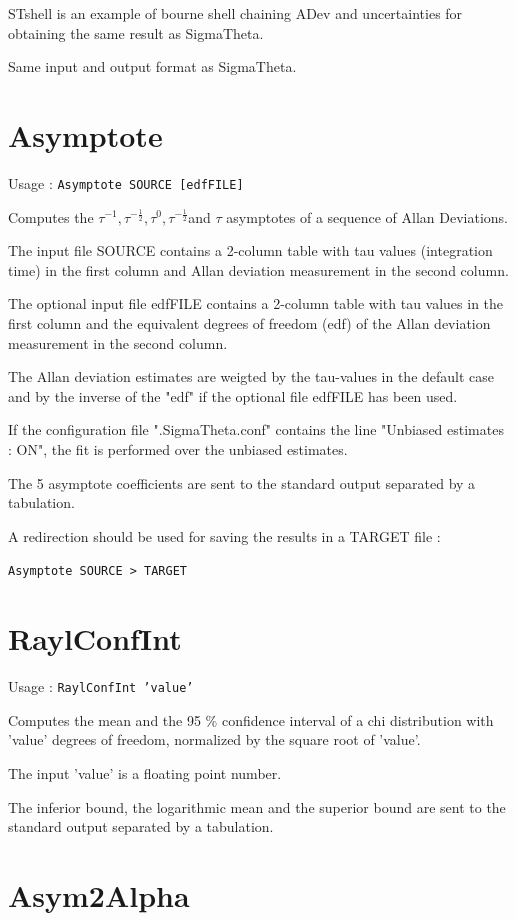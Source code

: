 \documentclass[10pt,a4paper,french]{article}
\begin{document}
STshell is an example of bourne shell chaining ADev and uncertainties for obtaining the same result as SigmaTheta.

Same input and output format as SigmaTheta.

\section{Asymptote}

Usage : {\tt{Asymptote SOURCE [edfFILE]}}

Computes the $\tau^{-1}, \tau^{-\frac{1}{2}}, \tau^0 , \tau^{-\frac{1}{2}} $and $\tau$ asymptotes of a sequence of Allan Deviations.

The input file SOURCE contains a 2-column table with tau values (integration time) in the first column and Allan deviation measurement in the second column.

The optional input file edfFILE contains a 2-column table with tau values in the first column and the equivalent degrees of freedom (edf) of the Allan deviation measurement in the second column.

The Allan deviation estimates are weigted by the tau-values in the default case and by the inverse of the "edf" if the optional file edfFILE has been used.

If the configuration file ".SigmaTheta.conf" contains the line "Unbiased estimates : ON", the fit is performed over the unbiased estimates.

The 5 asymptote coefficients are sent to the standard output separated by a tabulation.

A redirection should be used for saving the results in a TARGET file : 

{\tt{Asymptote SOURCE > TARGET}}

\section{RaylConfInt}

Usage : {\tt{RaylConfInt ’value’}}

Computes the mean and the 95 \% confidence interval of a chi distribution with ’value’ degrees of freedom, normalized by the square root of ’value’.

The input ’value’ is a floating point number.

The inferior bound, the logarithmic mean and the superior bound are sent to the standard output separated by a tabulation.

\section{Asym2Alpha}
\end{document}
